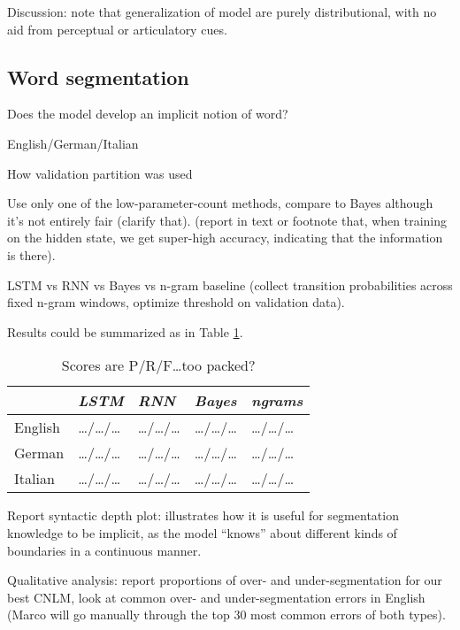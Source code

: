 Discussion: note that generalization of model are purely
distributional, with no aid from perceptual or articulatory cues.


\subsection{Word segmentation}
\label{sec:segmentation}


Does the model develop an implicit notion of word?

English/German/Italian

How validation partition was used

Use only one of the low-parameter-count methods, compare to Bayes
although it's not entirely fair (clarify that). (report in text or
footnote that, when training on the hidden state, we get super-high
accuracy, indicating that the information is there).

LSTM vs RNN vs Bayes vs n-gram baseline (collect transition
probabilities across fixed n-gram windows, optimize threshold on
validation data).

Results could be summarized as in Table \ref{tab:segmentation-results}.


\begin{table}[t]
  \begin{center}
    \begin{tabular}{l|l|l|l|l}
      \multicolumn{1}{c}{}&\emph{LSTM}&\emph{RNN}&\emph{Bayes}&\emph{ngrams}\\
      \hline
      English &\ldots{}/\ldots{}/\ldots & \ldots{}/\ldots{}/\ldots & \ldots{}/\ldots{}/\ldots &\ldots{}/\ldots{}/\ldots\\
      German &\ldots{}/\ldots{}/\ldots & \ldots{}/\ldots{}/\ldots & \ldots{}/\ldots{}/\ldots &\ldots{}/\ldots{}/\ldots\\
      Italian &\ldots{}/\ldots{}/\ldots & \ldots{}/\ldots{}/\ldots & \ldots{}/\ldots{}/\ldots &\ldots{}/\ldots{}/\ldots\\
    \end{tabular}
  \end{center}
  \caption{\label{tab:segmentation-results} Scores are P/R/F\ldots too packed?}
\end{table}

Report syntactic depth plot: illustrates how it is useful for
segmentation knowledge to be implicit, as the model ``knows'' about
different kinds of boundaries in a continuous manner.

Qualitative analysis: report proportions of over- and
under-segmentation for our best CNLM, look at common over- and
under-segmentation errors in English (Marco will go manually
through the top 30 most common errors of both types).

